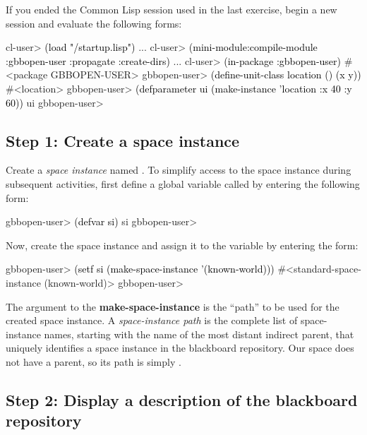 \documentclass[10pt,twoside,english,pdftex]{article}
\begin{document}
%
%
%
If you ended the Common Lisp session used in the last exercise, begin a new
session and evaluate the following forms:
%
\W\supp
\begin{example}
\textcolor{darkergray}{%
  cl-user> \textcolor{black}{(load "/startup.lisp")}
     ...
  cl-user> \textcolor{black}{(mini-module:compile-module :gbbopen-user :propagate :create-dirs)}
     ...
  cl-user> \textcolor{black}{(in-package :gbbopen-user)}
  #<package GBBOPEN-USER>
  gbbopen-user> \textcolor{black}{(define-unit-class location ()
                  (x y))}
  #<location>
  gbbopen-user> \textcolor{black}{(defparameter ui (make-instance 'location :x 40 :y 60))}
  ui
  gbbopen-user>}
\end{example}

\subsection*{Step 1: Create a space instance}

%
%
Create a \textit{space instance\/} named .  To simplify
access to the space instance during subsequent activities, first define a
global variable called  by entering the following form:
%
\W\supp
\begin{example}
\textcolor{darkergray}{%
  gbbopen-user> \textcolor{black}{(defvar si)}
  si
  gbbopen-user>}
\end{example}

%
%
Now, create the space instance and assign it to the variable  by
entering the form:
%
\W\supp
\begin{example}
\textcolor{darkergray}{%
  gbbopen-user> \textcolor{black}{(setf si (make-space-instance '(known-world)))}
  #<standard-space-instance (known-world)>
  gbbopen-user>}
\end{example}

The argument to the \textbf{make-space-instance} is the ``path'' to be used
for the created space instance.  A \textit{space-instance path} is the
complete list of space-instance names, starting with the name of the most
distant indirect parent, that uniquely identifies a space instance in the
blackboard repository.  Our  space does not have a parent,
so its path is simply .

\subsection*{Step 2: Display a description of the blackboard repository}
\end{document}

